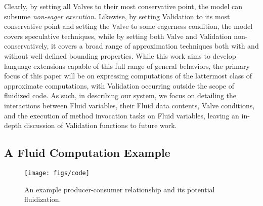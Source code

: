 Clearly, by setting all Valves to their most conservative point, the model can subsume {\em non-eager execution.} Likewise, by setting Validation to its most conservative point and setting the Valve to some eagerness condition, the model covers speculative techniques, while by setting both Valve and Validation non-conservatively, it covers a broad range of approximation techniques both with and without well-defined bounding properties. While this work aims to develop language extensions capable of this full range of general behaviors, the primary focus of this paper will be on expressing computations of the lattermost class of approximate computations, with Validation occurring outside the scope of fluidized code. As such, in describing our system, we focus on detailing the interactions between Fluid variables, their Fluid data contents, Valve conditions, and the execution of method invocation tasks on Fluid variables, leaving an in-depth discussion of Validation functions to future work.



\subsection{A Fluid Computation Example} 

\begin{figure}
\centering
\texttt{[image: figs/code]}
\vspace{-12pt}\caption{An example producer-consumer relationship and its potential fluidization.}\label{figs:code}\vspace{-32pt}
\end{figure}

